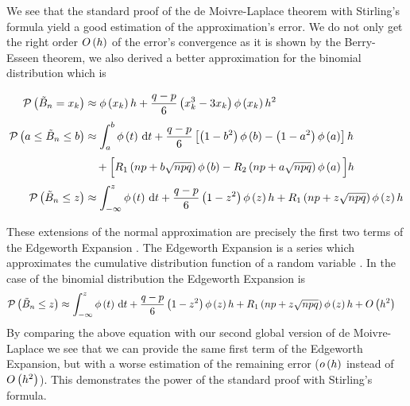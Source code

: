 

We see that the standard proof of the de Moivre-Laplace theorem with Stirling's formula yield a good estimation of the approximation's error. We do not only get the right order $O\left( {h} \right)$ of the error's convergence as it is shown by the Berry-Esseen theorem, we also derived a better approximation for the binomial distribution which is

\begin{align}
  \P{\BBs = \x}& \approx \fphi{\x} h +\frac{q-p}6 \left(\x^3-3\x\right) \fphi{\x} h^2 \nl
  \P{a \le \BBs \le b} & \approx  \int_a^b \fphi{t} \d{t} + \frac{q-p}6 \left[\br{1-b^2}\fphi{b}-\br{1-a^2}\fphi{a}\right] h \nl
  & \quad +\Big[\Ro{np + b\sqrt{npq}}\fphi{b} - \Rt{np + a \sqrt{npq}}\fphi{a}\Big]h \nl
  \P{\BBs \le z} & \approx \int_{-\infty}^z \fphi{t} \d{t} + \frac{q-p}6 \br{1-z^2}\fphi{z} h + \Ro{np+z\sqrt{npq}} \fphi{z} h 
\end{align}

These extensions of the normal approximation are precisely the first two terms of the Edgeworth Expansion \cite[pp. 39 ff.]{hall}\cite{wiki:edgeworth}. The Edgeworth Expansion is a series which approximates the cumulative distribution function of a random variable \cite{wiki:edgeworth}. In the case of the binomial distribution the Edgeworth Expansion is \cite[p. 46]{hall}
\begin{align}
  \mathcal P\left({\tilde B_{n} \le z}\right) & \approx \int_{-\infty}^z \phi\left( {t} \right) \,\mathrm d{t} + \frac{q-p}6 \left( {1-z^2} \right)\phi\left( {z} \right) h + R_1\left({np + z \sqrt{npq}}\right)\phi\left( {z} \right)h + O\left( {h^2} \right)
\end{align}
By comparing the above equation with our second global version of de Moivre-Laplace we see that we can provide the same first term of the Edgeworth Expansion, but with a worse estimation of the remaining error ($o\left( {h} \right)$ instead of $O\left( {h^2} \right)$). This demonstrates the power of the standard proof with Stirling's formula.
